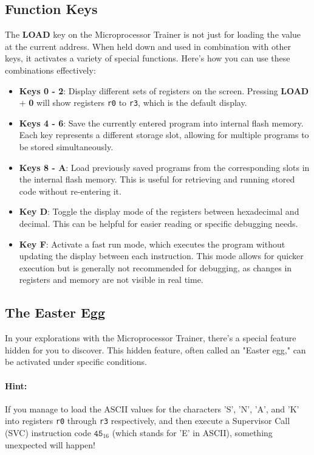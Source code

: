 \documentclass[12pt]{article}
\begin{document}
\subsection{Function Keys}

The \textbf{LOAD} key on the Microprocessor Trainer is not just for loading the value at the current address. When held down and used in combination with other keys, it activates a variety of special functions. Here's how you can use these combinations effectively:

\begin{itemize}
    \item \textbf{Keys 0 - 2}: Display different sets of registers on the screen. Pressing \textbf{LOAD} + \textbf{0} will show registers \texttt{r0} to \texttt{r3}, which is the default display.
    \item \textbf{Keys 4 - 6}: Save the currently entered program into internal flash memory. Each key represents a different storage slot, allowing for multiple programs to be stored simultaneously.
    \item \textbf{Keys 8 - A}:   Load previously saved programs from the corresponding slots in the internal flash memory. This is useful for retrieving and running stored code without re-entering it.
    \item \textbf{Key D}:  Toggle the display mode of the registers between hexadecimal and decimal. This can be helpful for easier reading or specific debugging needs.
    \item \textbf{Key F}: Activate a fast run mode, which executes the program without updating the display between each instruction. This mode allows for quicker execution but is generally not recommended for debugging, as changes in registers and memory are not visible in real time.
\end{itemize}

\subsection{The Easter Egg}
In your explorations with the Microprocessor Trainer, there's a special feature hidden for you to discover. This hidden feature, often called an "Easter egg," can be activated under specific conditions.

\paragraph{Hint:}
If you manage to load the ASCII values for the characters 'S', 'N', 'A', and 'K' into registers \texttt{r0} through \texttt{r3} respectively, and then execute a Supervisor Call (SVC) instruction code $\texttt{45}_{16}$ (which stands for 'E' in ASCII), something unexpected will happen!
\end{document}
